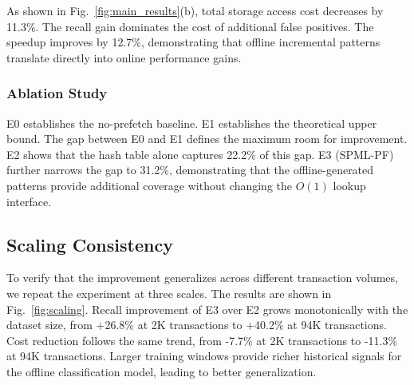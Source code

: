 \documentclass[conference]{IEEEtran}
\begin{document}
As shown in Fig.~\ref{fig:main_results}(b), total storage access cost decreases by 11.3\%. The recall gain dominates the cost of additional false positives. The speedup improves by 12.7\%, demonstrating that offline incremental patterns translate directly into online performance gains.

\subsubsection{Ablation Study}

E0 establishes the no-prefetch baseline. E1 establishes the theoretical upper bound. The gap between E0 and E1 defines the maximum room for improvement. E2 shows that the hash table alone captures 22.2\% of this gap. E3 (SPML-PF) further narrows the gap to 31.2\%, demonstrating that the offline-generated patterns provide additional coverage without changing the $O(1)$ lookup interface.

\subsection{Scaling Consistency}

To verify that the improvement generalizes across different transaction volumes, we repeat the experiment at three scales. The results are shown in Fig.~\ref{fig:scaling}.
Recall improvement of E3 over E2 grows monotonically with the dataset size, from +26.8\% at 2K transactions to +40.2\% at 94K transactions. Cost reduction follows the same trend, from -7.7\% at 2K transactions to -11.3\% at 94K transactions. Larger training windows provide richer historical signals for the offline classification model, leading to better generalization.

\end{document}
